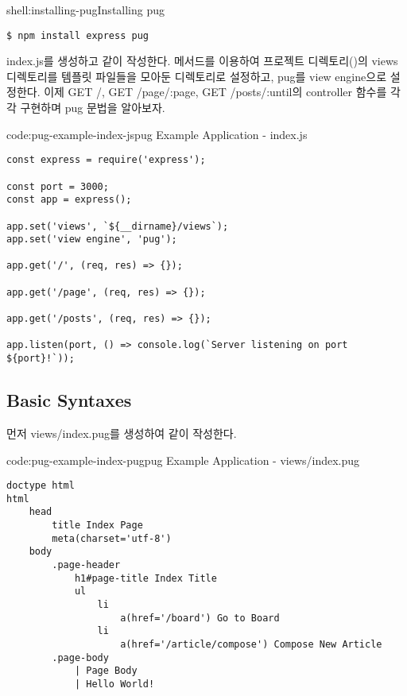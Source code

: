 \begin{shell}{shell:installing-pug}{Installing pug}
\begin{verbatim}
$ npm install express pug
\end{verbatim}
\end{shell}

index.js를 생성하고 \와 같이 작성한다.  메서드를 이용하여 프로젝트 디렉토리()의 views 디렉토리를 템플릿 파일들을 모아둔 디렉토리로 설정하고, pug를 view engine으로 설정한다. 이제 GET /, GET /page/:page, GET /posts/:until의 controller 함수를 각각 구현하며 pug 문법을 알아보자.

\begin{code}{code:pug-example-index-js}{pug Example Application - index.js}
\begin{verbatim}
const express = require('express');

const port = 3000;
const app = express();

app.set('views', `${__dirname}/views`);
app.set('view engine', 'pug');

app.get('/', (req, res) => {});

app.get('/page', (req, res) => {});

app.get('/posts', (req, res) => {});

app.listen(port, () => console.log(`Server listening on port ${port}!`));
\end{verbatim}
\end{code}

\subsection*{Basic Syntaxes}

먼저 views/index.pug를 생성하여 \와 같이 작성한다.

\begin{code}{code:pug-example-index-pug}{pug Example Application - views/index.pug}
\begin{verbatim}
doctype html
html
    head
        title Index Page
        meta(charset='utf-8')
    body
        .page-header
            h1#page-title Index Title
            ul
                li
                    a(href='/board') Go to Board
                li
                    a(href='/article/compose') Compose New Article
        .page-body
            | Page Body
            | Hello World!
\end{verbatim}
\end{code}


